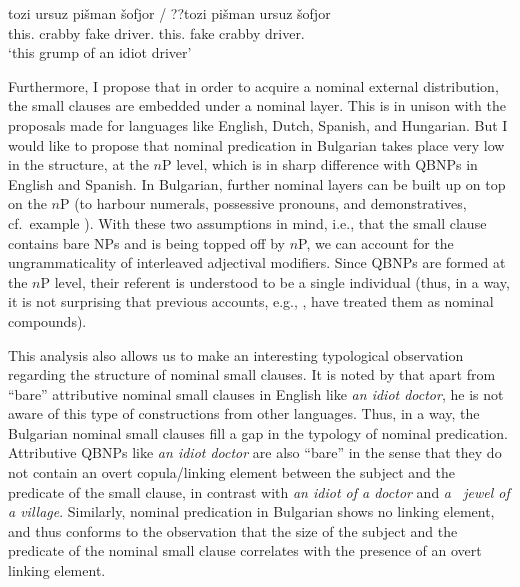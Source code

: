 \documentclass[output=paper]{langscibook}
\begin{document}
\ea \label{ge-ex-recurs}
\gll tozi ursuz pi\v{s}man \v{s}ofjor / ??tozi pi\v{s}man ursuz \v{s}ofjor\\
this.\M{} crabby fake driver.\M{} \phantom{/} \phantom{??}this.\M{} fake crabby driver.\M{} \\
\glt `this grump of an idiot driver' 
\z 

\noindent Furthermore, I propose that in order to acquire a nominal external distribution, the small clauses are embedded under a nominal layer. This is in unison with the proposals made for languages like English, Dutch, Spanish, and Hungarian. But I would like to propose that nominal predication in Bulgarian takes place very low in the structure, at the $n$P level, which is in sharp difference with QBNPs in English and Spanish. In Bulgarian, further nominal layers can be built up on top on the $n$P (to harbour numerals, possessive pronouns, and demonstratives, cf.\ example ). With these two assumptions in mind, i.e., that the small clause contains bare NPs and is being topped off by $n$P, we can account for the ungrammaticality of interleaved adjectival modifiers. Since QBNPs are formed at the $n$P level, their referent is understood to be a single individual (thus, in a way, it is not surprising that previous accounts, e.g., \citealt{Halpern1995}, have treated them as nominal compounds). 

This analysis also allows us to make an interesting typological observation regarding the structure of nominal small clauses. It is noted by \citet[168]{denDikken2006} that apart from “bare” attributive nominal small clauses in English like \emph{an idiot doctor}, he is not aware of this type of constructions from other languages. Thus, in a way, the Bulgarian nominal small clauses fill a gap in the typology of nominal predication. Attributive QBNPs like \emph{an idiot doctor} are also “bare” in the sense that they do not contain an overt copula\slash linking element between the subject and the predicate of the small clause, in contrast with \emph{an idiot of a doctor} and \emph{a~ jewel of a village}. Similarly, nominal predication in Bulgarian shows no linking element, and thus conforms to the observation that the size of the subject and the predicate of the nominal small clause correlates with the presence of an overt linking element.
\end{document}
